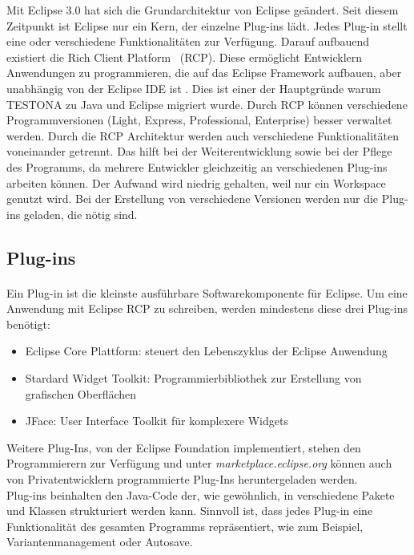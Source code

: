 Mit Eclipse 3.0 hat sich die Grundarchitektur von Eclipse geändert. Seit diesem Zeitpunkt ist Eclipse nur ein Kern, der einzelne Plug-ins lädt. Jedes Plug-in stellt eine oder verschiedene Funktionalitäten zur Verfügung. Darauf aufbauend existiert die \glqq Rich Client Platform\grqq~ (RCP). Diese ermöglicht Entwicklern Anwendungen zu programmieren, die auf das Eclipse Framework aufbauen, aber unabhängig von der Eclipse IDE ist\cite{EclipseRCP} \cite{Eclipse}. Dies ist einer der Hauptgründe warum TESTONA zu Java und Eclipse migriert wurde. Durch RCP können verschiedene Programmversionen (Light, Express, Professional, Enterprise) besser verwaltet werden. Durch die RCP Architektur werden auch verschiedene Funktionalitäten voneinander getrennt. Das hilft bei der Weiterentwicklung sowie bei der Pflege des Programms, da mehrere Entwickler gleichzeitig an verschiedenen Plug-ins arbeiten können. Der Aufwand wird niedrig gehalten, weil nur ein Workspace genutzt wird. Bei der Erstellung von verschiedene Versionen werden nur die Plug-ins geladen, die nötig sind.


\subsection{Plug-ins}
\paragraph{}
Ein Plug-in ist die kleinste ausführbare Softwarekomponente für Eclipse. Um eine Anwendung mit Eclipse RCP zu schreiben, werden mindestens diese drei Plug-ins benötigt:

\begin{itemize}
\item Eclipse Core Plattform: steuert den Lebenszyklus der Eclipse Anwendung
\item Stardard Widget Toolkit: Programmierbibliothek zur Erstellung von grafischen Oberflächen
\item JFace: User Interface Toolkit für komplexere Widgets
\end{itemize}

Weitere Plug-Ins, von der Eclipse Foundation implementiert, stehen den Programmierern zur Verfügung und unter \textit{marketplace.eclipse.org} können auch von Privatentwicklern programmierte Plug-Ins heruntergeladen werden. \cite{Eclipse}\\

Plug-ins beinhalten den Java-Code der, wie gewöhnlich, in verschiedene Pakete und Klassen strukturiert werden kann. Sinnvoll ist, dass jedes Plug-in eine Funktionalität des gesamten Programms repräsentiert, wie zum Beispiel, Variantenmanagement oder Autosave.\\


